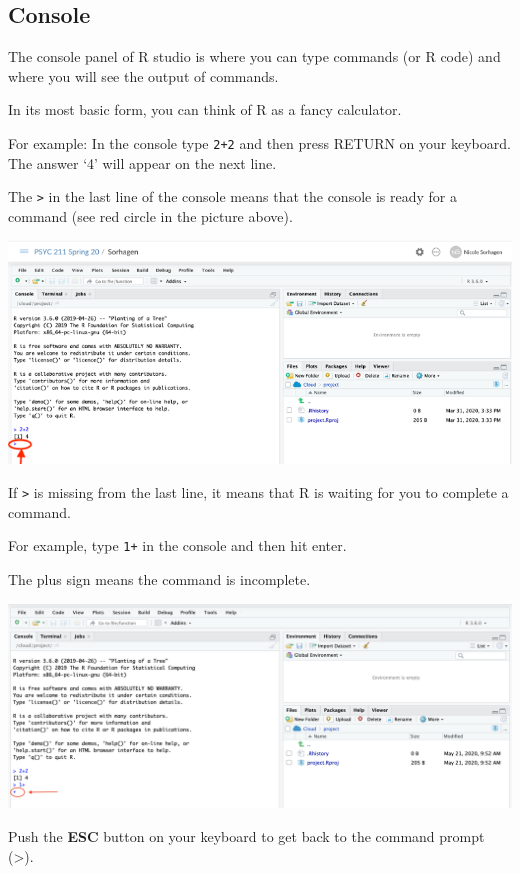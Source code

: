 \documentclass[
]{book}
\begin{document}
\hypertarget{console}{%
\subsection{Console}\label{console}}

The console panel of R studio is where you can type commands (or R code) and where you will see the output of commands.

In its most basic form, you can think of R as a fancy calculator.

For example: In the console type \texttt{2+2} and then press RETURN on your keyboard. The answer `4' will appear on the next line.

The \texttt{\textgreater{}} in the last line of the console means that the console is ready for a command (see red circle in the picture above).

\includegraphics{img/twoplus.png}

If \texttt{\textgreater{}} is missing from the last line, it means that R is waiting for you to complete a command.

For example, type \texttt{1+} in the console and then hit enter.

The plus sign means the command is incomplete.

\includegraphics{img/waiting.png}

Push the \textbf{ESC} button on your keyboard to get back to the command prompt (\textgreater).
\end{document}
